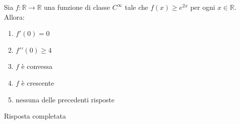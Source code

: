 \begin{quiz}
Sia $f:\mathbb R\to\mathbb R$ una funzione di classe $C^\infty$ tale che $f(x)\ge e^{2x}$ per ogni $x\in\mathbb R$. Allora:
\begin{enumerate}
\item $f\prime(0)=0$
\item $f\prime\prime(0)\ge4$
\item $f$ \`e convessa
\item $f$ \`e crescente
\item nessuna delle precedenti risposte
\end{enumerate}
\end{quiz}
Risposta completata

